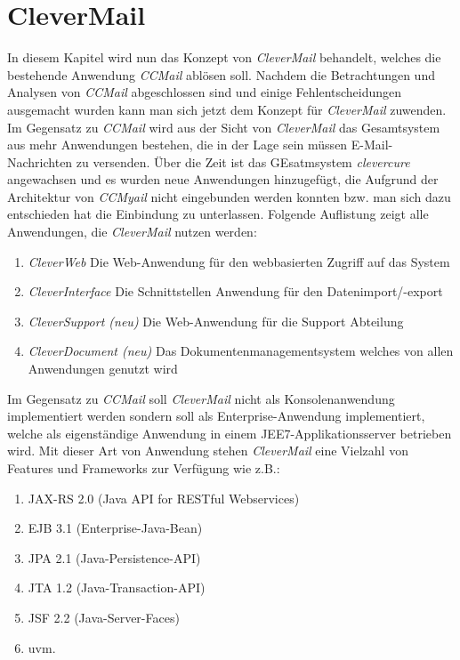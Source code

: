 \chapter{CleverMail}
\label{cha:clevermail}
In diesem Kapitel wird nun das Konzept von \emph{CleverMail} behandelt, welches die bestehende Anwendung \emph{CCMail} ablösen soll. Nachdem die Betrachtungen und Analysen von \emph{CCMail} abgeschlossen sind und einige Fehlentscheidungen ausgemacht wurden kann man sich jetzt dem Konzept für \emph{CleverMail} zuwenden. Im Gegensatz zu \emph{CCMail} wird aus der Sicht von \emph{CleverMail} das Gesamtsystem aus mehr Anwendungen bestehen, die in der Lage sein müssen E-Mail-Nachrichten zu versenden. Über die Zeit ist das GEsatmsystem \emph{clevercure} angewachsen und es wurden neue Anwendungen hinzugefügt, die Aufgrund der Architektur von \emph{CCMyail} nicht eingebunden werden konnten bzw. man sich dazu entschieden hat die Einbindung zu unterlassen.
\newline
\newline
Folgende Auflistung zeigt alle Anwendungen, die \emph{CleverMail} nutzen werden:
\begin{enumerate}
	\item\emph{CleverWeb}
	\newline
	Die Web-Anwendung für den webbasierten Zugriff auf das System
	\item\emph{CleverInterface}
	\newline
	Die Schnittstellen Anwendung für den Datenimport/-export
	\item\emph{CleverSupport (neu)}
	\newline
	Die Web-Anwendung für die Support Abteilung
	\item\emph{CleverDocument (neu)}
	\newline
	 Das Dokumentenmanagementsystem welches von allen Anwendungen genutzt wird
\end{enumerate}
Im Gegensatz zu \emph{CCMail} soll \emph{CleverMail} nicht als Konsolenanwendung implementiert werden sondern soll als Enterprise-Anwendung implementiert, welche als eigenständige Anwendung in einem JEE7-Applikationsserver betrieben wird.
\newpage
Mit dieser Art von Anwendung stehen \emph{CleverMail} eine Vielzahl von Features und Frameworks zur Verfügung wie z.B.: 
\begin{enumerate}
	\item JAX-RS 2.0 (Java API for RESTful Webservices)
	\item EJB 3.1 (Enterprise-Java-Bean)
	\item JPA 2.1 (Java-Persistence-API)
	\item JTA 1.2 (Java-Transaction-API)
	\item JSF 2.2 (Java-Server-Faces)
	\item uvm.
\end{enumerate}
